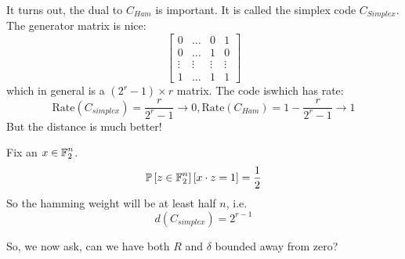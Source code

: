 It turns out, the dual to $C_{Ham}$ is important. It is called the simplex code $C_{Simplex}$. The generator matrix is nice:
\[ \begin{bmatrix}
    0 & \dots & 0 & 1 \\
    0 & \dots & 1 & 0 \\
    \vdots & \vdots & \vdots & \vdots \\
    1 & \dots & 1 & 1
\end{bmatrix} \]
which in general is a $(2^r - 1) \times r$ matrix. The code iswhich has rate:
\[ \text{Rate}(C_{simplex}) = \frac{r}{2^r - 1} \to 0, \text{Rate}(C_{Ham}) = 1 - \frac{r}{2^r - 1} \to 1 \]
But the distance is much better!

Fix an $x \in \operatorname{\mathbb{F}}_2^n$.
\[ \mathbb{P}\left[ z \in \operatorname{\mathbb{F}}_2^n \right] [x \cdot z = 1] = \frac{1}{2} \]
So the hamming weight will be at least half $n$, i.e.
\[ d(C_{simplex}) = 2^{r - 1} \]

So, we now ask, can we have both $R$ and $\delta$ bounded away from zero?